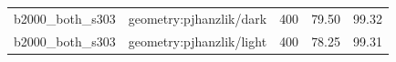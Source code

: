 \begin{longtable}{l>{\raggedright\arraybackslash}p{.42\linewidth}rrr}
b2000\_\allowbreak{}both\_\allowbreak{}s303 & %
geometry:pjhanzlik/dark & %
400 & %
79.50 & %
99.32 \\ %

b2000\_\allowbreak{}both\_\allowbreak{}s303 & %
geometry:pjhanzlik/light & %
400 & %
78.25 & %
99.31 \\ %


\end{longtable}
